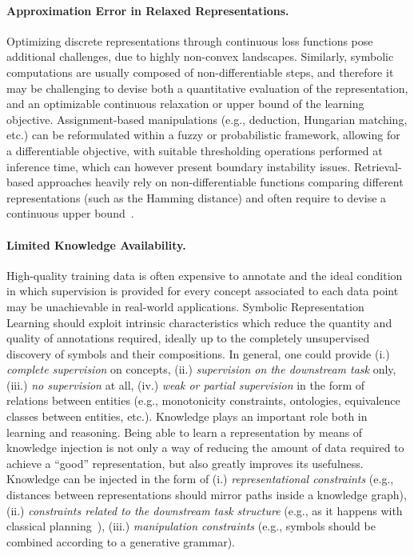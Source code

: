 \paragraph{Approximation Error in Relaxed Representations.}
Optimizing discrete representations through continuous loss functions pose additional challenges, due to highly non-convex landscapes. 
%
Similarly, symbolic computations are usually composed of non-differentiable steps, and therefore it may be challenging to devise both a quantitative evaluation of the representation, and an optimizable continuous relaxation or upper bound of the learning objective.
%
Assignment-based manipulations (e.g., deduction, Hungarian matching, etc.) can be reformulated within a fuzzy or probabilistic framework, allowing for a differentiable objective, with suitable thresholding operations performed at inference time, which can however present boundary instability issues.
%
Retrieval-based approaches heavily rely on non-differentiable functions comparing different representations (such as the Hamming distance) and often require to devise a continuous upper bound~\cite{norouzi2012hamming}.

\paragraph{Limited Knowledge Availability.}
High-quality training data is often expensive to annotate and the ideal condition in which supervision is provided for every concept associated to each data point may be unachievable in real-world applications. 
Symbolic Representation Learning should exploit intrinsic characteristics which reduce the quantity and quality of annotations required, ideally up to the completely unsupervised discovery of symbols and their compositions. 
In general, one could provide (i.) \textit{complete supervision} on concepts, (ii.) \textit{supervision on the downstream task} only, (iii.) \textit{no supervision} at all, (iv.) \textit{weak or partial supervision} in the form of relations between entities (e.g., monotonicity constraints, ontologies, equivalence classes between entities, etc.).
%
Knowledge plays an important role both in learning and reasoning. Being able to learn a representation by means of knowledge injection is not only a way of reducing the amount of data required to achieve a ``good'' representation, but also greatly improves its usefulness.
%
Knowledge can be injected in the form of (i.) \textit{representational constraints} (e.g.,
distances between representations should mirror paths inside a knowledge graph), (ii.) \textit{constraints related to the downstream task structure} (e.g., as it happens with classical planning~\cite{asai2018classical}), (iii.) \textit{manipulation constraints} (e.g., symbols should be combined according to a generative grammar).

